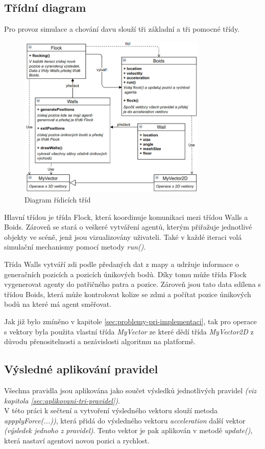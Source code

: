 \documentclass[czech,public,dept460,male,cpdeclaration]{diploma}
\begin{document}
\subsection{Třídní diagram}
Pro provoz simulace a chování davu slouží tři základní a tři pomocné třídy.

\begin{figure}[H]\centering\includegraphics[width=0.8\textwidth]{Figures/diagram2.jpg}
	\caption{Diagram řídicích tříd}
\end{figure}

Hlavní třídou je třída Flock, která koordinuje komunikaci mezi třídou Walls a Boids. Zároveň se stará o veškeré vytváření agentů, kterým přiřažuje jednotlivé objekty ve scéně, jenž jsou vizualizovány uživateli. Také v každé iteraci volá simulační mechanismy pomocí metody \textit{run()}.

Třída Walls vytváří zdi podle předaných dat z mapy a udržuje informace o generačních pozicích a pozicích únikových bodů. Díky tomu může třída Flock vygenerovat agenty do patřičného patra a pozice. Zároveň jsou tato data sdílena s třídou Boids, která může kontrolovat kolize se zdmi a počítat pozice únikových bodů na které má agent směřovat.

Jak již bylo zmíněno v kapitole \ref{sec:problemy-pri-implementaci}, tak pro operace s vektory byla použita vlastní třída \textit{MyVector} ze které dědí třída \textit{MyVector2D} z důvodu přenositelnosti a nezávislosti algoritmu na platformě.

\subsection{Výsledné aplikování pravidel}
Všechna pravidla jsou aplikována jako součet výsledků jednotlivých pravidel \textit{(viz kapitola \ref{sec:aplikovani-tri-pravidel})}. \\V této práci k sečtení a vytvoření výsledného vektoru slouží metoda \textit{appplyForce(...))}, která přidá do výsledného vektoru \textit{acceleration} další vektor \textit{(výsledek jednoho z pravidel)}. Tento vektor je pak aplikován v metodě \textit{update()}, která nastaví agentovi novou pozici a rychlost.
\end{document}

